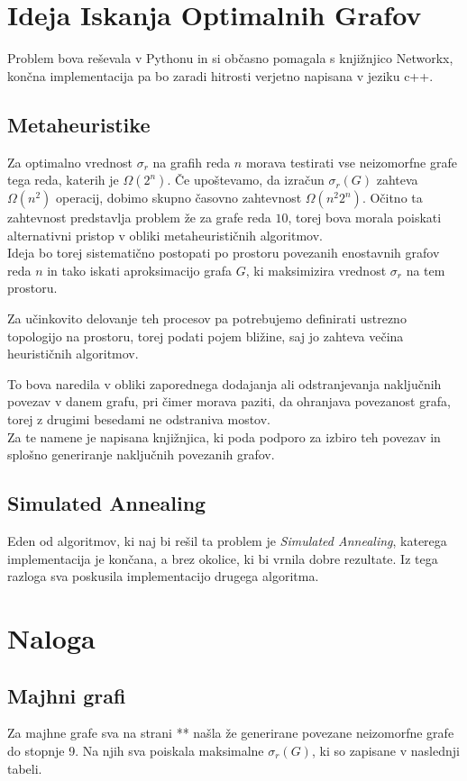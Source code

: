 \documentclass[ letterpaper, titlepage, fleqn]{article}
\begin{document}
\section{Ideja Iskanja Optimalnih Grafov}
Problem bova reševala v Pythonu in si občasno pomagala s knjižnjico Networkx,
končna implementacija pa bo zaradi hitrosti verjetno napisana v jeziku c++.

\subsection{Metaheuristike}
Za optimalno vrednost $\sigma_r$ na grafih reda $n$ morava testirati vse neizomorfne
grafe tega reda, katerih je $\Omega(2^n)$. Če upoštevamo, da izračun $\sigma_r(G)$ 
zahteva $\Omega(n^2)$ operacij, dobimo skupno časovno zahtevnost $\Omega(n^2 2^n)$.
Očitno ta zahtevnost predstavlja problem že za grafe reda $10$, 
torej bova morala poiskati alternativni pristop v obliki metaheurističnih algoritmov. \\

Ideja bo torej sistematično postopati po prostoru povezanih enostavnih grafov reda $n$ in 
tako iskati aproksimacijo grafa $G$, ki maksimizira vrednost $\sigma_r$ na tem prostoru.

Za učinkovito delovanje teh procesov pa potrebujemo definirati ustrezno topologijo 
na prostoru, torej podati pojem bližine, saj jo zahteva večina heurističnih algoritmov.

To bova naredila v obliki zaporednega dodajanja ali odstranjevanja naključnih povezav v 
danem grafu, pri čimer morava paziti, da ohranjava povezanost grafa, 
torej z drugimi besedami ne odstraniva mostov.\\
Za te namene je napisana knjižnjica, ki poda podporo za izbiro teh povezav
in splošno generiranje naključnih povezanih grafov.

\subsection{Simulated Annealing}
Eden od algoritmov, ki naj bi rešil ta problem je {\em Simulated Annealing}, 
katerega implementacija je končana, a brez okolice, ki bi vrnila dobre rezultate.
Iz tega razloga sva poskusila implementacijo drugega algoritma.

\section{Naloga}

\subsection{Majhni grafi}
Za majhne grafe sva na strani ** našla že generirane povezane neizomorfne grafe do stopnje 9.
Na njih sva poiskala maksimalne $\sigma_r(G)$, ki so zapisane v naslednji tabeli.
\end{document}
